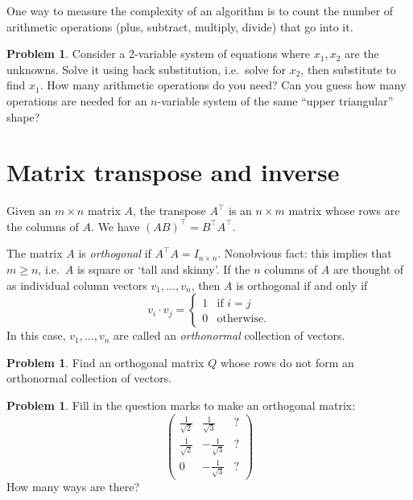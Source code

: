 \documentclass[10pt]{amsart}
\theoremstyle{mythm}
\theoremstyle{definition}
\newtheorem{prob}[thm]{Problem}
\theoremstyle{myrmk}
\begin{document}
	\begin{minipage}[t]{.5\textwidth}
		One way to measure the complexity of an algorithm is to count the number of arithmetic operations (plus, subtract, multiply, divide) that go into it. 
		\begin{prob}
			Consider a 2-variable system of equations  
			where $x_1, x_2$ are the unknowns. Solve it using back substitution, i.e.\ solve for $x_2$, then substitute to find $x_1$. How many arithmetic operations do you need? Can you guess how many operations are needed for an $n$-variable system of the same ``upper triangular'' shape? 
		\end{prob}
	\end{minipage}
	
	\newpage
	
	\section{Matrix transpose and inverse} 
	
	Given an $m \times n$ matrix $A$, the transpose $A^\top$ is an $n \times m$ matrix whose rows are the columns of $A$. We have $(AB)^\top = B^\top A^\top$. 
	
	The matrix $A$ is \emph{orthogonal} if $A^\top A = I_{n \times n}$. Nonobvious fact: this implies that $m \ge n$, i.e.\ $A$ is square or `tall and skinny'. If the $n$ columns of $A$ are thought of as individual column vectors $v_1, \ldots, v_n$, then $A$ is orthogonal if and only if 
	\[
		v_i \cdot v_j = \begin{cases}
		1 & \text{if } i = j \\
		0 & \text{otherwise}.
		\end{cases}
	\]
	In this case, $v_1, \ldots, v_n$ are called an \emph{orthonormal} collection of vectors. 
	
	\begin{prob}
		Find an orthogonal matrix $Q$ whose rows do not form an orthonormal collection of vectors. 
	\end{prob}
	
	\begin{prob}
		Fill in the question marks to make an orthogonal matrix: 
		\[
			\begin{pmatrix}
				\frac{1}{\sqrt{2}} & \frac{1}{\sqrt{3}} & ? \\
				\frac{1}{\sqrt{2}} & -\frac{1}{\sqrt{3}} & ? \\
				0 & -\frac{1}{\sqrt{3}} & ?
			\end{pmatrix}
		\]
		How many ways are there? 
	\end{prob}
	
\end{document}
